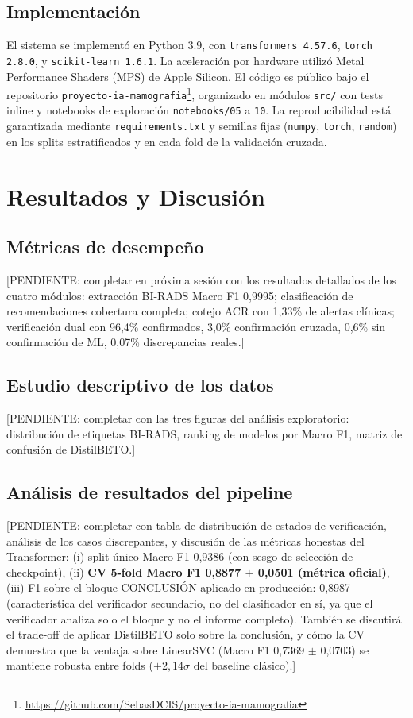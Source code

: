 \documentclass[10pt,journal,a4paper]{IEEEtran}
\begin{document}
\subsection{Implementaci\'on}
El sistema se implement\'o en Python 3.9, con \texttt{transformers 4.57.6}, \texttt{torch 2.8.0}, y \texttt{scikit-learn 1.6.1}. La aceleraci\'on por hardware utiliz\'o Metal Performance Shaders (MPS) de Apple Silicon. El c\'odigo es p\'ublico bajo el repositorio \texttt{proyecto-ia-mamografia}\footnote{\url{https://github.com/SebasDCIS/proyecto-ia-mamografia}}, organizado en m\'odulos \texttt{src/} con tests inline y notebooks de exploraci\'on \texttt{notebooks/05} a \texttt{10}. La reproducibilidad est\'a garantizada mediante \texttt{requirements.txt} y semillas fijas (\texttt{numpy}, \texttt{torch}, \texttt{random}) en los splits estratificados y en cada fold de la validaci\'on cruzada.

\section{Resultados y Discusi\'on}

\subsection{M\'etricas de desempe\~no}
[PENDIENTE: completar en pr\'oxima sesi\'on con los resultados detallados de los cuatro m\'odulos: extracci\'on BI-RADS Macro F1 0,9995; clasificaci\'on de recomendaciones cobertura completa; cotejo ACR con 1,33\% de alertas cl\'inicas; verificaci\'on dual con 96,4\% confirmados, 3,0\% confirmaci\'on cruzada, 0,6\% sin confirmaci\'on de ML, 0,07\% discrepancias reales.]

\subsection{Estudio descriptivo de los datos}
[PENDIENTE: completar con las tres figuras del an\'alisis exploratorio: distribuci\'on de etiquetas BI-RADS, ranking de modelos por Macro F1, matriz de confusi\'on de DistilBETO.]

\subsection{An\'alisis de resultados del pipeline}
[PENDIENTE: completar con tabla de distribuci\'on de estados de verificaci\'on, an\'alisis de los casos discrepantes, y discusi\'on de las m\'etricas honestas del Transformer: (i) split \'unico Macro F1 0,9386 (con sesgo de selecci\'on de checkpoint), (ii) \textbf{CV 5-fold Macro F1 0,8877 $\pm$ 0,0501 (m\'etrica oficial)}, (iii) F1 sobre el bloque CONCLUSI\'ON aplicado en producci\'on: 0,8987 (caracter\'istica del verificador secundario, no del clasificador en s\'i, ya que el verificador analiza solo el bloque y no el informe completo). Tambi\'en se discutir\'a el trade-off de aplicar DistilBETO solo sobre la conclusi\'on, y c\'omo la CV demuestra que la ventaja sobre LinearSVC (Macro F1 0,7369 $\pm$ 0,0703) se mantiene robusta entre folds ($+2,14\sigma$ del baseline cl\'asico).]
\end{document}
